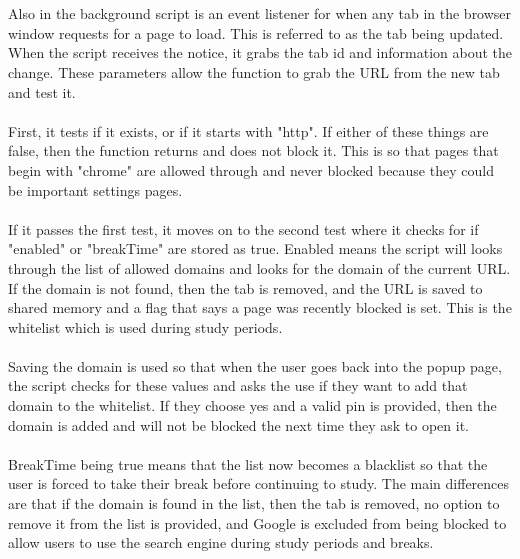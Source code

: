 \documentclass[12pt]{article}
\begin{document}
\\\\Also in the background script is an event listener for when any tab in the browser window requests for a page to load. This is referred to as the tab being updated.
When the script receives the notice, it grabs the tab id and information about the change. These parameters allow the function
to grab the URL from the new tab and test it. \\\\
\indent First, it tests if it exists, or if it starts with "http". If either of these things are false, then the function returns and does not block it.
This is so that pages that begin with "chrome" are allowed through and never blocked because they could be important settings pages.
\\\\\indent If it passes the first test, it moves on to the second test where it checks for if "enabled" or "breakTime" are stored as true. Enabled means the 
script will looks through the list of allowed domains and looks for the domain of the current URL. If the domain is not found, then the tab is removed, and the URL is saved to shared memory and a flag that says a page was recently blocked is set.
This is the whitelist which is used during study periods. 
\\\\\indent Saving the domain is used so that when the user goes back into the popup page, the script checks for these values and asks the use if they want to add that domain to the whitelist. If they choose yes and a valid pin is provided, then the domain
is added and will not be blocked the next time they ask to open it. \\\\
\indent
BreakTime being true means that the list now becomes a blacklist so that the user is forced to take their break before continuing to study. The main differences are that if the domain is found in the list, then the tab is removed, 
no option to remove it from the list is provided, and Google is excluded from being blocked to allow users to use the search engine during study periods and breaks.
\\\\
\end{document}
